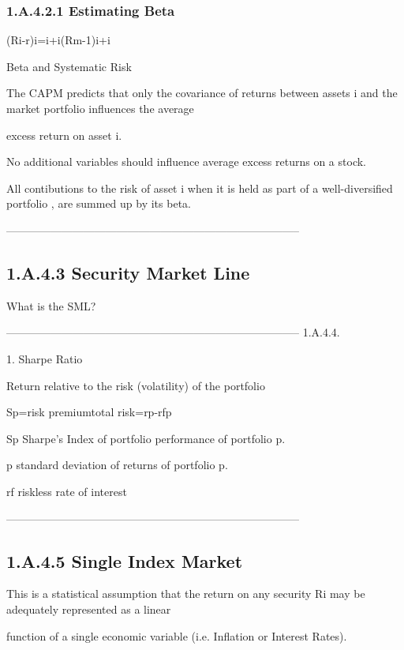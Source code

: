 \subsubsection{1.A.4.2.1 Estimating Beta}


(Ri-r)i=i+i(Rm-1)i+i



Beta and Systematic Risk


The CAPM predicts that only the covariance of returns between assets i and the market portfolio influences the average

excess return on asset i.


No additional variables should influence average excess returns on a stock.


All contibutions to the risk of asset i when it is held as part of a well-diversified portfolio , are summed up by its beta.




--------------------------------------------------------------------------------
\subsection{1.A.4.3 Security Market Line}


What is the SML?




--------------------------------------------------------------------------------
1.A.4.4.


1. Sharpe Ratio


Return relative to the risk (volatility) of the portfolio


Sp=risk premiumtotal risk=rp-rfp


Sp Sharpe's Index of portfolio performance of portfolio p.

p standard deviation of returns of portfolio p. 

rf riskless rate of interest




--------------------------------------------------------------------------------
\subsection{1.A.4.5 Single Index Market}


This is a statistical assumption that the return on any security Ri may be adequately represented as a linear

function of a single economic variable (i.e. Inflation or Interest Rates).


